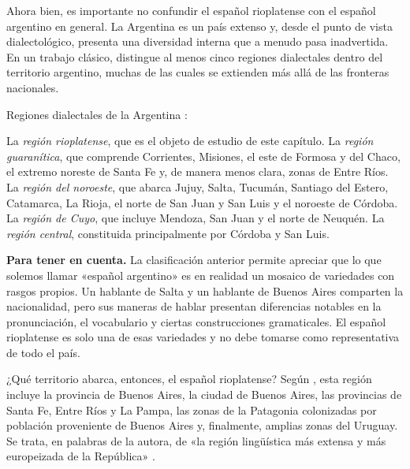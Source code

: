 Ahora bien, es importante no confundir el español rioplatense con el español
argentino en general. La Argentina es un país extenso y, desde el punto de vista
dialectológico, presenta una diversidad interna que a menudo pasa inadvertida. En
un trabajo clásico, \textcite{vidal1964} distingue al menos cinco regiones
dialectales dentro del territorio argentino, muchas de las cuales se extienden
más allá de las fronteras nacionales.

\begin{exe}
  \ex\label{ex:15-regiones} Regiones dialectales de la Argentina
      \parencite{vidal1964}:
    \begin{xlist}
      \ex La \textit{región rioplatense}, que es el objeto de estudio de este
          capítulo.
      \ex La \textit{región guaranítica}, que comprende Corrientes, Misiones, el
          este de Formosa y del Chaco, el extremo noreste de Santa Fe y, de manera
          menos clara, zonas de Entre Ríos.
      \ex La \textit{región del noroeste}, que abarca Jujuy, Salta, Tucumán,
          Santiago del Estero, Catamarca, La Rioja, el norte de San Juan y San Luis
          y el noroeste de Córdoba.
      \ex La \textit{región de Cuyo}, que incluye Mendoza, San Juan y el norte de
          Neuquén.
      \ex La \textit{región central}, constituida principalmente por Córdoba y San
          Luis.
    \end{xlist}
\end{exe}


\begin{destacado}
\textbf{Para tener en cuenta.} La clasificación anterior permite apreciar que lo
que solemos llamar «español argentino» es en realidad un mosaico de variedades
con rasgos propios. Un hablante de Salta y un hablante de Buenos Aires comparten
la nacionalidad, pero sus maneras de hablar presentan diferencias notables en la
pronunciación, el vocabulario y ciertas construcciones gramaticales. El español
rioplatense es solo una de esas variedades y no debe tomarse como representativa
de todo el país.
\end{destacado}

¿Qué territorio abarca, entonces, el español rioplatense? Según
\textcite{vidal1964}, esta región incluye la provincia de Buenos Aires, la ciudad
de Buenos Aires, las provincias de Santa Fe, Entre Ríos y La Pampa, las zonas de
la Patagonia colonizadas por población proveniente de Buenos Aires y,
finalmente, amplias zonas del Uruguay. Se trata, en palabras de la autora, de
«la región lingüística más extensa y más europeizada de la República»
\parencite[76]{vidal1964}.

